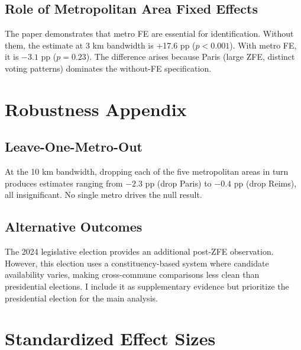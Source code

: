 \documentclass[12pt]{article}
\begin{document}
\subsection{Role of Metropolitan Area Fixed Effects}

The paper demonstrates that metro FE are essential for identification. Without them, the estimate at 3 km bandwidth is +17.6 pp ($p < 0.001$). With metro FE, it is $-3.1$ pp ($p = 0.23$). The difference arises because Paris (large ZFE, distinct voting patterns) dominates the without-FE specification.

\section{Robustness Appendix}

\subsection{Leave-One-Metro-Out}

At the 10 km bandwidth, dropping each of the five metropolitan areas in turn produces estimates ranging from $-2.3$ pp (drop Paris) to $-0.4$ pp (drop Reims), all insignificant. No single metro drives the null result.

\subsection{Alternative Outcomes}

The 2024 legislative election provides an additional post-ZFE observation. However, this election uses a constituency-based system where candidate availability varies, making cross-commune comparisons less clean than presidential elections. I include it as supplementary evidence but prioritize the presidential election for the main analysis.

\section{Standardized Effect Sizes}
\label{sec:sde}


\end{document}
